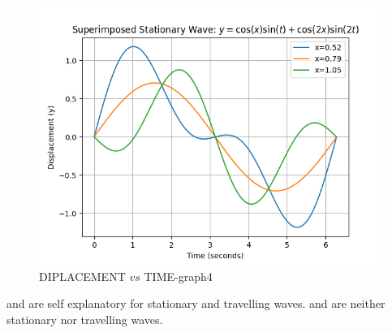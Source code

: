 \documentclass[journal,12pt,twocolumn]{IEEEtran}
\theoremstyle{remark}
\begin{document}
\begin{figure}[ht]
                            \centering
                            \includegraphics[width=\columnwidth]{figs/d.png}
                            \caption{DIPLACEMENT $vs$ TIME-graph4}
                            \label{fig:4}
\end{figure}
 and  are self explanatory for stationary and travelling waves.
 and  are neither stationary nor travelling waves. 
\end{document}
